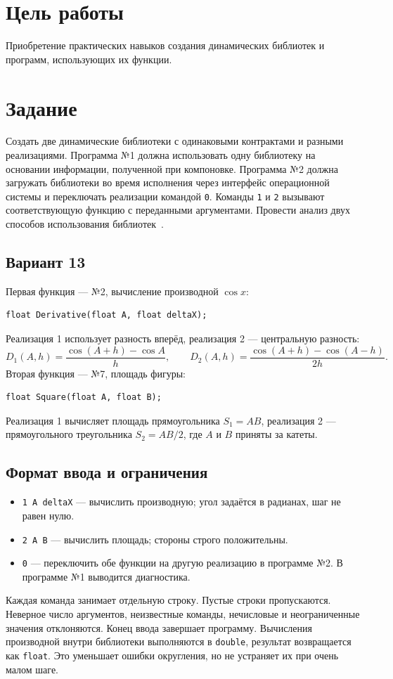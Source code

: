 \section{Цель работы}
Приобретение практических навыков создания динамических библиотек и программ, использующих их функции.

\section{Задание}
Создать две динамические библиотеки с одинаковыми контрактами и разными реализациями. Программа №1 должна использовать одну библиотеку на основании информации, полученной при компоновке. Программа №2 должна загружать библиотеки во время исполнения через интерфейс операционной системы и переключать реализации командой \texttt{0}. Команды \texttt{1} и \texttt{2} вызывают соответствующую функцию с переданными аргументами. Провести анализ двух способов использования библиотек~\cite{task}.

\subsection{Вариант 13}
Первая функция --- №2, вычисление производной $\cos x$:
\begin{verbatim}
float Derivative(float A, float deltaX);
\end{verbatim}
Реализация 1 использует разность вперёд, реализация 2 --- центральную разность:
\[
D_1(A,h)=\frac{\cos(A+h)-\cos A}{h},\qquad
D_2(A,h)=\frac{\cos(A+h)-\cos(A-h)}{2h}.
\]
Вторая функция --- №7, площадь фигуры:
\begin{verbatim}
float Square(float A, float B);
\end{verbatim}
Реализация 1 вычисляет площадь прямоугольника $S_1=AB$, реализация 2 --- прямоугольного треугольника $S_2=AB/2$, где $A$ и $B$ приняты за катеты.

\subsection{Формат ввода и ограничения}
\begin{itemize}
\item \texttt{1 A deltaX} --- вычислить производную; угол задаётся в радианах, шаг не равен нулю.
\item \texttt{2 A B} --- вычислить площадь; стороны строго положительны.
\item \texttt{0} --- переключить обе функции на другую реализацию в программе №2. В программе №1 выводится диагностика.
\end{itemize}
Каждая команда занимает отдельную строку. Пустые строки пропускаются. Неверное число аргументов, неизвестные команды, нечисловые и неограниченные значения отклоняются. Конец ввода завершает программу. Вычисления производной внутри библиотеки выполняются в \texttt{double}, результат возвращается как \texttt{float}. Это уменьшает ошибки округления, но не устраняет их при очень малом шаге.
